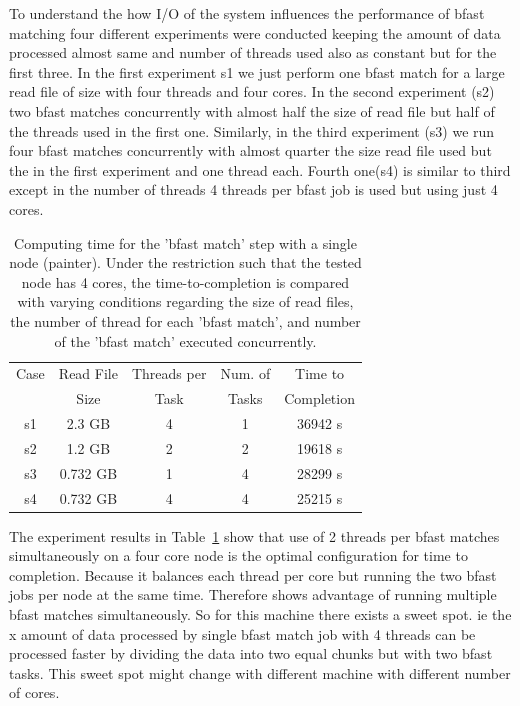 \documentclass{acm_proc_article-sp}
\begin{document}
{
To understand the how I/O of the system influences the performance 
of bfast matching four different experiments were conducted keeping 
the amount of data processed almost same and number of threads  used also 
as constant but for the first three. In the first experiment s1 we just perform one 
bfast match for  a large read file of size with four threads and four cores.
 In the second experiment (s2) two bfast matches concurrently with almost half the size 
 of read file but half of the threads  used in the first one. Similarly, in the third 
 experiment (s3) we run four bfast matches concurrently with almost quarter the 
 size read file used but the in the first experiment and one thread each. Fourth
 one(s4) is similar to third except in the number of  threads 4 threads per bfast job is used but using just 4 cores.

 \begin{table}

 \begin{tabular}{|c|c|c|c|c|} 
 \hline 
Case & Read File  & Threads per & Num. of   & Time to \\
& Size & Task &  Tasks &  Completion \\  \hline
s1 & 2.3 GB &  4 & 1 & 36942 s \\
s2 & 1.2 GB & 2 & 2 & 19618 s \\
s3 & 0.732 GB & 1 & 4 & 28299 s\\ 
s4& 0.732  GB & 4 & 4 & 25215 s\\
 \hline
 \end{tabular}
 \label{table:understandio} 
 \caption{Computing time for the 'bfast match' step with a single node
   (painter). Under the restriction such that the tested node has 4
   cores, the time-to-completion is compared with varying conditions
   regarding the size of read files, the number of thread for each
   'bfast match', and number of the 'bfast match' executed
   concurrently.}
\end{table}

The experiment results in Table~\ref{table:understandio} show that
 use of 2 threads per bfast matches simultaneously 
on a four core node is the optimal configuration for time to completion.
 Because it balances each thread per core but  
running the two bfast jobs per node at the same time. Therefore shows
 advantage of running multiple bfast matches simultaneously. 
So for this machine there exists a sweet spot. ie the x amount of data processed by single 
bfast match job with 4 threads can be processed faster by dividing the data into two equal 
chunks but with two bfast tasks. This sweet spot might change with different machine with different number of cores.

}
\end{document}
